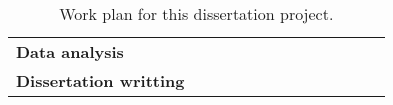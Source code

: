 \begin{table}[!ht]
{\begin{tabular}{lllllllllll}
            \textbf{Data analysis} & \cellcolor{lightgreen} & \cellcolor{darkgreen} & \cellcolor{lightgreen} & \cellcolor{darkgreen} & \cellcolor{lightgreen} & \cellcolor{lightgreen} & \cellcolor{darkgreen} & \cellcolor{darkgreen} & \cellcolor{lightgreen} & \cellcolor{lightgreen}\\ 
            \textbf{Dissertation writting} & ~ & ~ & ~ & ~ & \cellcolor{lightgreen} & \cellcolor{lightgreen} & \cellcolor{lightgreen} & \cellcolor{darkgreen} & \cellcolor{darkgreen} & \cellcolor{darkgreen} \\ \hline
        \end{tabular}
    }
    \caption{Work plan for this dissertation project.}
    \label{tab:Work Plan: work plan}
\end{table}




